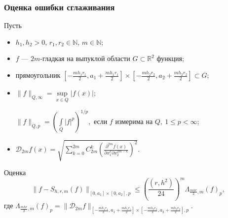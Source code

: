 \documentclass[pdf, 9pt, unicode]{beamer} %
\begin{document}
\begin{frame}
  \frametitle{Оценка ошибки сглаживания}

Пусть 
\begin{itemize}

\item
$h_1, h_2 > 0$,
$r_1, r_2 \in \mathbb{N}$, 
$m \in \mathbb{N}$;

\item
$f$ --- $2m$-гладкая на выпуклой области $G\subset\mathbb{R}^2$ функция; 

\item
прямоугольник $[-\frac{mh_1r_1}{2},a_1+\frac{mh_1r_1}{2}]\times[-\frac{mh_2r_2}{2},a_2+\frac{mh_2r_2}{2}] \subset G$;

\item
$\|f\|_{Q,\infty}=\sup\limits_{x\in Q}|f(x)|;$

$  \|f\|_{Q,p}=\left(\int\limits_{Q}|f|^p\right)^{1/p},$
если $f$ измерима на $Q,\ 1\leqslant p < \infty$; 

\item
$
\mathcal{D}_{2m}f(x) =  \sqrt{\sum\limits_{k=0}^{2m}C_{2m}^{k}\left (\frac{\partial^{2m} f(x)}{\partial x_1^{k} \partial x_2^{2m-k}}\right)^2}.
$

\end{itemize}

\begin{block}{Оценка} 
  \begin{equation*}
\|f-S_{h,r,m}(f)\|_{[0,a_1]\times[0,a_2],p}\leqslant \left(\frac{(r,h^2)}{24}\right)^m\Lambda_{\frac{mhr}{2},m}(f)_p,
  \end{equation*}
где
$  
\Lambda_{\frac{mhr}{2},m}(f)_p=\|\mathcal{D}_{2m}f\|_{[-\frac{mh_1r_1}{2}, a_1+\frac{mh_1r_1}{2}]\times[-\frac{mh_2r_2}{2},a_2+\frac{mh_2r_2}{2}],p}.
$
\end{block}
\end{frame}
\end{document}

